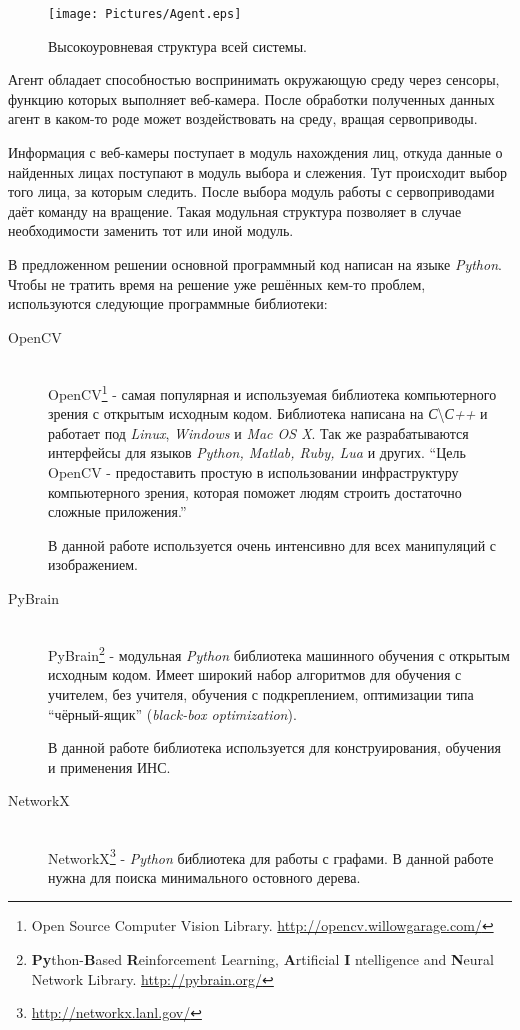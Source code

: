 \documentclass[12pt]{report}
\begin{document}
\begin{figure}[h]
	\centering
	\texttt{[image: Pictures/Agent.eps]}
	\caption{Высокоуровневая структура всей системы.}
	\label{fig:agent}
\end{figure}

Агент обладает способностью воспринимать окружающую среду через сенсоры, функцию которых выполняет веб-камера. 
После 
обработки полученных данных агент в каком-то роде может воздействовать на среду, вращая сервоприводы. \citep
{рассел2006искусственный}

Информация с веб-камеры поступает в модуль нахождения лиц, откуда данные о найденных лицах поступают в модуль 
выбора 
и слежения. Тут происходит выбор того лица, за которым следить. После выбора модуль работы с сервоприводами даёт 
команду на вращение. Такая модульная структура позволяет в случае необходимости заменить тот или иной модуль. 

В предложенном решении основной программный код написан на языке \textit{Python}. Чтобы не тратить время на 
решение 
уже решённых кем-то проблем, используются следующие программные библиотеки:
\begin{description}

\item[OpenCV]\hfill \\
	OpenCV\footnote{Open Source Computer Vision Library. \url{http://opencv.willowgarage.com/}} - самая популярная 
и 
используемая библиотека компьютерного зрения с открытым исходным кодом. Библиотека написана на \textit{С}\textbackslash{}\textit{С++} и работает под \textit{Linux}, \textit{Windows} и \textit{Mac OS X}. Так же разрабатываются интерфейсы 
для языков \textit{Python, Matlab, Ruby, Lua} и других. ``Цель OpenCV - предоставить простую в использовании 
инфраструктуру компьютерного зрения, которая поможет людям строить достаточно сложные приложения.'' \citep
{bradski2008learning}
	
В данной работе используется очень интенсивно для всех манипуляций с изображением.

\item[PyBrain]\hfill \\
	PyBrain\footnote{\textbf{Py}thon-\textbf{B}ased \textbf{R}einforcement Learning, \textbf{A}rtificial \textbf{I}
ntelligence and \textbf{N}eural Network Library. \url{http://pybrain.org/}} - модульная \textit{Python} библиотека 
машинного обучения с открытым исходным кодом. Имеет широкий набор алгоритмов для обучения с учителем, без учителя, 
обучения с подкреплением, оптимизации типа ``чёрный-ящик'' (\textit{black-box optimization}).
	
В данной работе библиотека используется для конструирования, обучения и применения ИНС.

\item[NetworkX]\hfill \\
NetworkX\footnote{\url{http://networkx.lanl.gov/}} - \textit{Python} библиотека для работы с графами. В данной 
работе 
нужна для поиска минимального остовного дерева.

\end{description}
\end{document}
